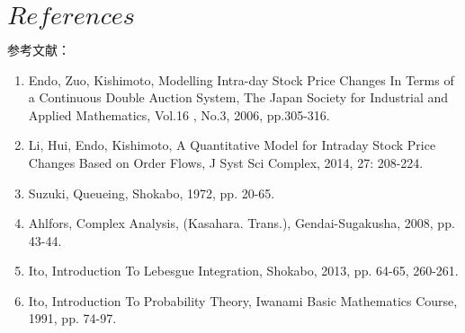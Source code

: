 \documentclass[a4j,papersize,disablejfam,slide,14pt]{jsarticle}
\begin{document}
\section{$References$}
	参考文献：
    \begin{enumerate}
        \item {\rm Endo, Zuo, Kishimoto, 
        Modelling Intra-day Stock Price Changes In Terms of
        a Continuous Double Auction System, 
        The Japan Society for Industrial and Applied Mathematics, 
        Vol.16 , No.3, 2006, pp.305-316.}
        \item {\rm Li, Hui, Endo, Kishimoto, A Quantitative Model for Intraday Stock Price
         Changes Based on Order Flows, 
         J Syst Sci Complex, 2014, 27: 208-224.}
        \item {\rm Suzuki, Queueing, Shokabo, 1972, pp. 20-65.}
        \item {\rm Ahlfors, Complex Analysis, (Kasahara. Trans.), Gendai-Sugakusha, 2008, pp. 43-44.}
        \item {\rm Ito, Introduction To Lebesgue Integration, Shokabo, 2013, pp. 64-65, 260-261.}
        \item {\rm Ito, Introduction To Probability Theory, Iwanami Basic Mathematics Course, 1991, pp. 74-97.}
    \end{enumerate}
    
\end{document}
